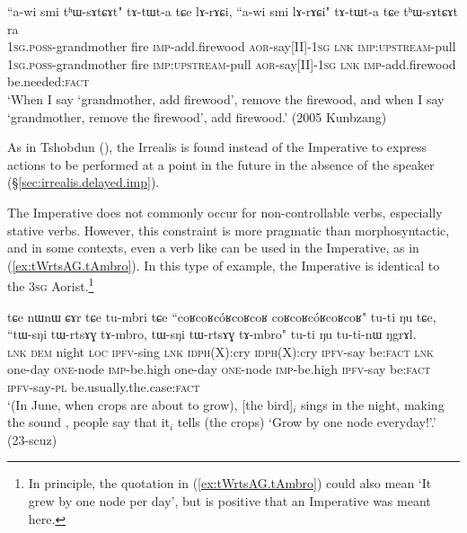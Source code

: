\begin{exe}
\ex \label{ex:thWsAtCAt.lArACi}
\gll ``a-wi smi tʰɯ-sɤtɕɤt" tɤ-tɯt-a tɕe lɤ-rɤɕi, ``a-wi smi lɤ-rɤɕi" tɤ-tɯt-a tɕe tʰɯ-sɤtɕɤt ra \\
\textsc{1sg}.\textsc{poss}-grandmother fire \textsc{imp}-add.firewood \textsc{aor}-say[II]-\textsc{1sg} \textsc{lnk} \textsc{imp}:\textsc{upstream}-pull \textsc{1sg}.\textsc{poss}-grandmother fire \textsc{imp}:\textsc{upstream}-pull  \textsc{aor}-say[II]-\textsc{1sg} \textsc{lnk} \textsc{imp}-add.firewood be.needed:\textsc{fact} \\
\glt `When I say `grandmother, add firewood', remove the firewood, and when I say `grandmother, remove the firewood', add firewood.' (2005 Kunbzang) 
\end{exe}

As in Tshobdun (\citealt[809]{jackson07irrealis}), the Irrealis is found instead of the Imperative to express actions to be performed at a point in the future in the absence of the speaker (§\ref{sec:irrealis.delayed.imp}). 

The Imperative does not commonly occur for non-controllable verbs, especially stative verbs. However, this constraint is more pragmatic than morphosyntactic, and in some contexts, even a verb like  can be used in the Imperative, as in (\ref{ex:tWrtsAG.tAmbro}). In this type of example, the Imperative  is identical to the \textsc{3sg} Aorist.\footnote{In principle, the quotation in (\ref{ex:tWrtsAG.tAmbro}) could also mean `It grew by one node per day', but  is positive that an Imperative was meant here. }

\begin{exe}
\ex \label{ex:tWrtsAG.tAmbro}
\gll tɕe nɯnɯ ɕɤr tɕe tu-mbri tɕe ``coʁcoʁcóʁcoʁcoʁ coʁcoʁcóʁcoʁcoʁ" tu-ti ŋu tɕe, ``tɯ-sŋi tɯ-rtsɤɣ tɤ-mbro, tɯ-sŋi tɯ-rtsɤɣ tɤ-mbro" tu-ti ŋu tu-ti-nɯ ŋgrɤl. \\
\textsc{lnk} \textsc{dem} night \textsc{loc} \textsc{ipfv}-sing \textsc{lnk} \textsc{idph}(X):cry  \textsc{idph}(X):cry \textsc{ipfv}-say be:\textsc{fact} \textsc{lnk} one-day \textsc{one}-node \textsc{imp}-be.high one-day \textsc{one}-node \textsc{imp}-be.high \textsc{ipfv}-say be:\textsc{fact} \textsc{ipfv}-say-\textsc{pl} be.usually.the.case:\textsc{fact}  \\
\glt `(In June, when crops are about to grow), [the  bird]$_i$ sings in the night, making the sound , people say that it$_i$  tells (the crops) `Grow by one node everyday!'.' (23-scuz)
\end{exe}

